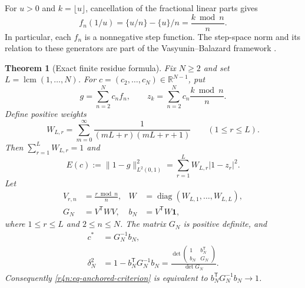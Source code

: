 \documentclass[11pt,a4paper]{article}
\newtheorem{theorem}{Theorem}[section]
\theoremstyle{definition}\newtheorem{definition}[theorem]{Definition}
\theoremstyle{remark}\newtheorem{remark}[theorem]{Remark}
\newcommand{\R}{\mathbb R}\newcommand{\Z}{\mathbb Z}
\numberwithin{equation}{section}
\begin{document}
For $u>0$ and $k=\lfloor u\rfloor$, cancellation of the fractional
linear parts gives
\begin{equation}
\label{r4n:eq-residue-values}
 f_n(1/u)=\{u/n\}-\{u\}/n=\frac{k\bmod n}{n}.
\end{equation}
In particular, each $f_n$ is a nonnegative step function.
The step-space norm and its relation to these generators are part of
the Vasyunin--Balazard framework \cite[Sections~1--2]{Balazard}.

\begin{theorem}[Exact finite residue formula]
\label{r4n:thm-finite-gram}
Fix $N\ge2$ and set $L=\operatorname{lcm}(1,\ldots,N)$.
For $c=(c_2,\ldots,c_N)\in\R^{N-1}$, put
\[
 g=\sum_{n=2}^Nc_nf_n,\qquad
 z_k=\sum_{n=2}^Nc_n\frac{k\bmod n}{n}.
\]
Define positive weights
\begin{equation}
\label{r4n:eq-orbit-weights}
 W_{L,r}=\sum_{m=0}^{\infty}
       \frac1{(mL+r)(mL+r+1)}
       \qquad(1\le r\le L).
\end{equation}
Then $\sum_{r=1}^LW_{L,r}=1$ and
\begin{equation}
\label{r4n:eq-finite-error}
 E(c):=\|1-g\|_{L^2(0,1)}^2
      =\sum_{r=1}^{L}W_{L,r}|1-z_r|^2.
\end{equation}
Let
\[
 \begin{aligned}
 V_{r,n}&=\frac{r\bmod n}{n},
 &W&=\operatorname{diag}(W_{L,1},\ldots,W_{L,L}),\\
 G_N&=V^{\mathsf T}WV,
 &b_N&=V^{\mathsf T}W\mathbf1,
 \end{aligned}
\]
where $1\le r\le L$ and $2\le n\le N$.
The matrix $G_N$ is positive definite, and
\begin{equation}
\label{r4n:eq-gram-distance}
 \begin{aligned}
 c^*&=G_N^{-1}b_N,\\
 \delta_N^2&=1-b_N^{\mathsf T}G_N^{-1}b_N
 =\frac{\det\begin{pmatrix}1&b_N^{\mathsf T}\\b_N&G_N\end{pmatrix}}
        {\det G_N}.
 \end{aligned}
\end{equation}
Consequently \eqref{r4n:eq-anchored-criterion} is equivalent to
$b_N^{\mathsf T}G_N^{-1}b_N\to1$.
\end{theorem}
\end{document}
